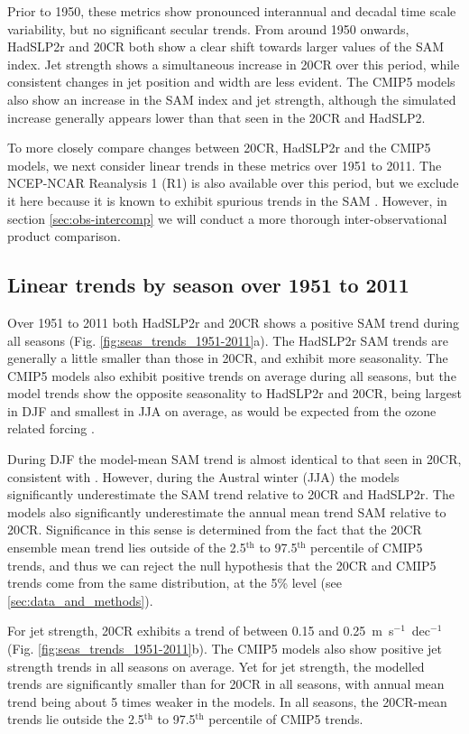 \documentclass{ametsoc}
\begin{document}
Prior to 1950, these metrics show pronounced
interannual and decadal time scale variability, but no significant secular  
trends. From around 1950 onwards, HadSLP2r and 20CR both show a clear shift towards 
larger values of the SAM index. Jet strength shows a simultaneous increase 
in 20CR over this period, while consistent changes in jet position and width are less evident. The 
CMIP5 models also show an increase in the SAM index and jet strength, although the simulated 
increase generally appears lower than that seen in the 20CR and HadSLP2. 

To more closely compare changes between 20CR, HadSLP2r and the CMIP5 models, we next consider linear 
trends in these metrics over 1951 to 2011. The NCEP-NCAR Reanalysis 1 (R1) is also available
over this period, but we exclude it here because it is known to exhibit spurious 
trends in the SAM \citep{Marshall_2003}. However, in section \ref{sec:obs-intercomp} 
we will conduct a more thorough inter-observational product comparison. 

\subsection{Linear trends by season over 1951 to 2011}
Over 1951 to 2011 both HadSLP2r and 20CR shows a positive SAM trend during all seasons 
(Fig. \ref{fig:seas_trends_1951-2011}a). The HadSLP2r SAM trends are generally a little 
smaller than those in 20CR, and exhibit more seasonality. The CMIP5 models also exhibit positive trends 
on average during all seasons, but the model trends show the opposite seasonality to HadSLP2r and 20CR,
being largest in DJF and smallest in JJA on average, as would be expected from the ozone
related forcing \citep{Son_et_al_2010, Thompson_et_al_2011}. 

During DJF the model-mean SAM trend is almost identical to that seen in 20CR, consistent 
with \cite{Gillett_and_Fyfe_2013}. However, during the Austral winter (JJA) 
the models significantly underestimate the SAM trend relative to 20CR and HadSLP2r. The
models also significantly underestimate the annual mean trend SAM relative to 20CR.
Significance in this sense is determined from the fact that the 20CR ensemble mean trend 
lies outside of the  2.5$^\textrm{th}$ to 97.5$^\textrm{th}$ percentile of CMIP5 trends, 
and thus we can reject the null
hypothesis that the 20CR and CMIP5 trends come from the same distribution, at the 5\% level
(see \ref{sec:data_and_methods}).


For jet strength, 20CR exhibits a trend of between 0.15 and 0.25~m~s$^{-1}$~dec$^{-1}$ 
(Fig. \ref{fig:seas_trends_1951-2011}b). The CMIP5 models also show positive jet strength 
trends in all seasons on average. Yet for jet strength, the modelled trends are 
significantly smaller than for 20CR in all seasons, with annual mean trend being about 
5 times weaker in the models. In all seasons, the 20CR-mean trends lie outside 
the 2.5$^\textrm{th}$ to 97.5$^\textrm{th}$ percentile of CMIP5 trends.
\end{document}
